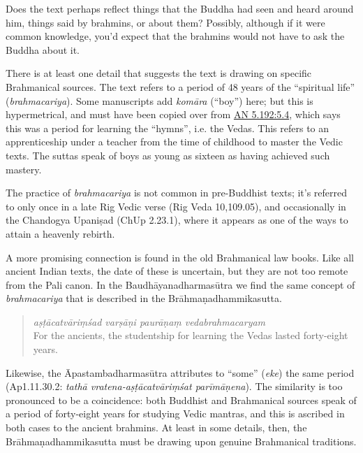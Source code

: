 \documentclass[12pt,openany]{book}%
\begin{document}
Does the text perhaps reflect things that the Buddha had seen and heard around him, things said by brahmins, or about them? Possibly, although if it were common knowledge, you’d expect that the brahmins would not have to ask the Buddha about it.

There is at least one detail that suggests the text is drawing on specific Brahmanical sources. The text refers to a period of 48 years of the “spiritual life” (\textit{brahmacariya}). Some manuscripts add \textit{\textsanskrit{komāra}} (“boy”) here; but this is hypermetrical, and must have been copied over from \href{https://suttacentral.net/an5.192/en/sujato\#5.4}{AN 5.192:5.4}, which says this was a period for learning the “hymns”, i.e. the Vedas. This refers to an apprenticeship under a teacher from the time of childhood to master the Vedic texts. The suttas speak of boys as young as sixteen as having achieved such mastery.

The practice of \textit{brahmacariya} is not common in pre-Buddhist texts; it’s referred to only once in a late Rig Vedic verse (Rig Veda 10,109.05), and occasionally in the Chandogya \textsanskrit{Upaniṣad} (ChUp 2.23.1), where it appears as one of the ways to attain a heavenly rebirth.

A more promising connection is found in the old Brahmanical law books. Like all ancient Indian texts, the date of these is uncertain, but they are not too remote from the Pali canon. In the \textsanskrit{Baudhāyanadharmasūtra} we find the same concept of \textit{brahmacariya} that is described in the \textsanskrit{Brāhmaṇadhammikasutta}.

\begin{verse}%
\textit{\textsanskrit{aṣṭācatvāriṃśad} \textsanskrit{varṣāṇi} \textsanskrit{paurāṇaṃ} vedabrahmacaryam} \\
For the ancients, the studentship for learning the Vedas lasted forty-eight years.

%
\end{verse}

Likewise, the \textsanskrit{Āpastambadharmasūtra} attributes to “some” (\textit{eke}) the same period (Ap1.11.30.2: \textit{\textsanskrit{tathā} vratena-\textsanskrit{aṣṭācatvāriṃśat} \textsanskrit{parīmāṇena}}). The similarity is too pronounced to be a coincidence: both Buddhist and Brahmanical sources speak of a period of forty-eight years for studying Vedic mantras, and this is ascribed in both cases to the ancient brahmins. At least in some details, then, the \textsanskrit{Brāhmaṇadhammikasutta} must be drawing upon genuine Brahmanical traditions.
\end{document}
